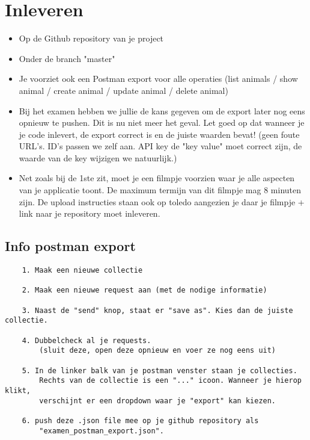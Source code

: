 \documentclass{article}
\begin{document}
\section{Inleveren}
\begin{itemize}
    \item Op de Github repository van je project
    \item Onder de branch "master"
    \item Je voorziet ook een Postman export voor alle operaties (list animals / show animal / create animal / update animal / delete animal)
    \item Bij het examen hebben we jullie de kans gegeven om de export later nog eens opnieuw te pushen. Dit is nu niet meer het geval. Let goed op dat wanneer je je code inlevert, de export correct is en de juiste waarden bevat! (geen foute URL's. ID's passen we zelf aan. API key de "key value" moet correct zijn, de waarde van de key wijzigen we natuurlijk.)
    \item Net zoals bij de 1ste zit, moet je een filmpje voorzien waar je alle aspecten van je applicatie toont. De maximum termijn van dit filmpje mag 8 minuten zijn. De upload instructies staan ook op toledo aangezien je daar je filmpje + link naar je repository moet inleveren.
\end{itemize}

\subsection{Info postman export}
\begin{verbatim}
    1. Maak een nieuwe collectie

    2. Maak een nieuwe request aan (met de nodige informatie)

    3. Naast de "send" knop, staat er "save as". Kies dan de juiste collectie.

    4. Dubbelcheck al je requests. 
        (sluit deze, open deze opnieuw en voer ze nog eens uit)

    5. In de linker balk van je postman venster staan je collecties. 
        Rechts van de collectie is een "..." icoon. Wanneer je hierop klikt, 
        verschijnt er een dropdown waar je "export" kan kiezen.

    6. push deze .json file mee op je github repository als 
        "examen_postman_export.json".
\end{verbatim}
\end{document}
